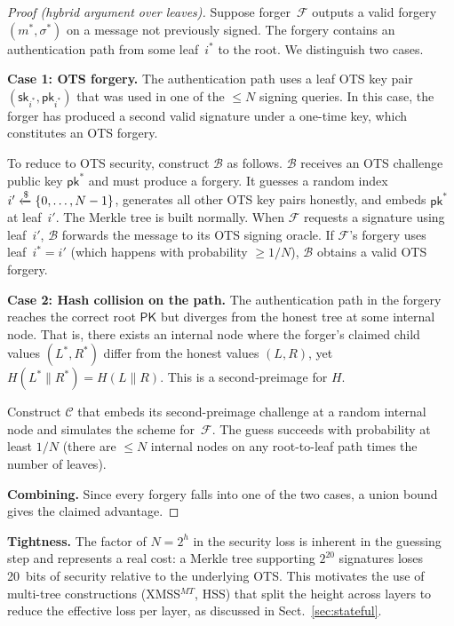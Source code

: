 \begin{proof}[Proof (hybrid argument over leaves)]
Suppose forger~$\mathcal{F}$ outputs a valid forgery
$(m^*, \sigma^*)$ on a message not previously signed.  The
forgery contains an authentication path from some leaf~$i^*$
to the root.  We distinguish two cases.

\medskip\noindent\textbf{Case 1: OTS forgery.}
The authentication path uses a leaf OTS key pair
$(\mathsf{sk}_{i^*}, \mathsf{pk}_{i^*})$ that was used in one
of the $\leq N$ signing queries.  In this case, the forger
has produced a second valid signature under a one-time key,
which constitutes an OTS forgery.

To reduce to OTS security, construct $\mathcal{B}$ as follows.
$\mathcal{B}$ receives an OTS challenge public key
$\mathsf{pk}^*$ and must produce a forgery.  It guesses a
random index $i' \getsr \{0, \ldots, N-1\}$, generates all
other OTS key pairs honestly, and embeds $\mathsf{pk}^*$ at
leaf~$i'$.  The Merkle tree is built normally.
When $\mathcal{F}$ requests a signature using leaf~$i'$,
$\mathcal{B}$ forwards the message to its OTS signing oracle.
If $\mathcal{F}$'s forgery uses leaf~$i^* = i'$ (which happens
with probability $\geq 1/N$), $\mathcal{B}$ obtains a valid
OTS forgery.

\medskip\noindent\textbf{Case 2: Hash collision on the path.}
The authentication path in the forgery reaches the correct
root $\mathsf{PK}$ but diverges from the honest tree at some
internal node.  That is, there exists an internal node where
the forger's claimed child values
$(L^*, R^*)$ differ from the honest values $(L, R)$, yet
$H(L^* \| R^*) = H(L \| R)$.  This is a second-preimage for
$H$.

Construct $\mathcal{C}$ that embeds its second-preimage
challenge at a random internal node and simulates the scheme
for~$\mathcal{F}$.  The guess succeeds with probability at
least $1/N$ (there are $\leq N$ internal nodes on any
root-to-leaf path times the number of leaves).

\medskip\noindent\textbf{Combining.}
Since every forgery falls into one of the two cases, a union
bound gives the claimed advantage.
\end{proof}

\noindent\textbf{Tightness.}
The factor of $N = 2^h$ in the security loss is inherent in
the guessing step and represents a real cost: a Merkle tree
supporting $2^{20}$ signatures loses 20~bits of security
relative to the underlying OTS.  This motivates the use of
multi-tree constructions (XMSS$^{MT}$, HSS) that split the
height across layers to reduce the effective loss per layer,
as discussed in Sect.~\ref{sec:stateful}.
